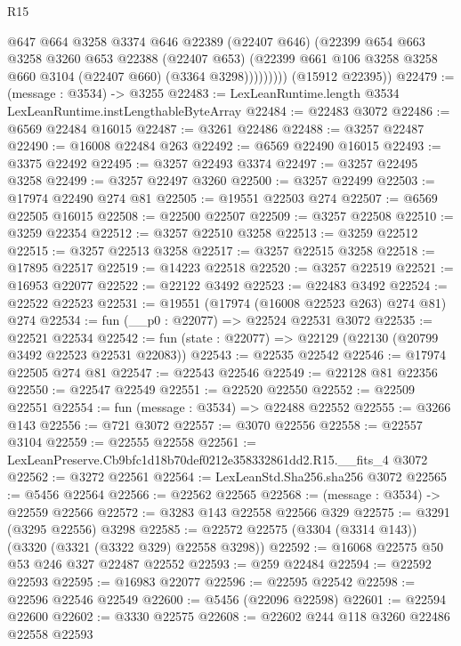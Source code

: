 \begin{lexlean}{R15}
\begin{coremodule}
                  @647
                  @664
                  @3258
                  @3374
                  @646
                  @22389
                  (@22407 @646)
                  (@22399
                    @654
                    @663
                    @3258
                    @3260
                    @653
                    @22388
                    (@22407 @653)
                    (@22399 @661 @106 @3258 @3258 @660 @3104 (@22407 @660) (@3364 @3298)))))))))
      (@15912 @22395))
@22479 := (message : @3534) -> @3255
@22483 := LexLeanRuntime.length @3534 LexLeanRuntime.instLengthableByteArray
@22484 := @22483 @3072
@22486 := @6569 @22484 @16015
@22487 := @3261 @22486
@22488 := @3257 @22487
@22490 := @16008 @22484 @263
@22492 := @6569 @22490 @16015
@22493 := @3375 @22492
@22495 := @3257 @22493 @3374
@22497 := @3257 @22495 @3258
@22499 := @3257 @22497 @3260
@22500 := @3257 @22499
@22503 := @17974 @22490 @274 @81
@22505 := @19551 @22503 @274
@22507 := @6569 @22505 @16015
@22508 := @22500 @22507
@22509 := @3257 @22508
@22510 := @3259 @22354
@22512 := @3257 @22510 @3258
@22513 := @3259 @22512
@22515 := @3257 @22513 @3258
@22517 := @3257 @22515 @3258
@22518 := @17895 @22517
@22519 := @14223 @22518
@22520 := @3257 @22519
@22521 := @16953 @22077
@22522 := @22122 @3492
@22523 := @22483 @3492
@22524 := @22522 @22523
@22531 := @19551 (@17974 (@16008 @22523 @263) @274 @81) @274
@22534 := fun (__p0 : @22077) => @22524 @22531 @3072
@22535 := @22521 @22534
@22542 := fun (state : @22077) => @22129 (@22130 (@20799 @3492 @22523 @22531 @22083))
@22543 := @22535 @22542
@22546 := @17974 @22505 @274 @81
@22547 := @22543 @22546
@22549 := @22128 @81 @22356
@22550 := @22547 @22549
@22551 := @22520 @22550
@22552 := @22509 @22551
@22554 := fun (message : @3534) => @22488 @22552
@22555 := @3266 @143
@22556 := @721 @3072
@22557 := @3070 @22556
@22558 := @22557 @3104
@22559 := @22555 @22558
@22561 := LexLeanPreserve.Cb9bfc1d18b70def0212e358332861dd2.R15.__fits_4 @3072
@22562 := @3272 @22561
@22564 := LexLeanStd.Sha256.sha256 @3072
@22565 := @5456 @22564
@22566 := @22562 @22565
@22568 := (message : @3534) -> @22559 @22566
@22572 := @3283 @143 @22558 @22566 @329
@22575 := @3291 (@3295 @22556) @3298
@22585 := @22572 @22575 (@3304 (@3314 @143)) (@3320 (@3321 (@3322 @329) @22558 @3298))
@22592 := @16068 @22575 @50 @53 @246 @327 @22487 @22552
@22593 := @259 @22484
@22594 := @22592 @22593
@22595 := @16983 @22077
@22596 := @22595 @22542
@22598 := @22596 @22546 @22549
@22600 := @5456 (@22096 @22598)
@22601 := @22594 @22600
@22602 := @3330 @22575
@22608 := @22602 @244 @118 @3260 @22486 @22558 @22593

\end{coremodule}
\end{lexlean}
